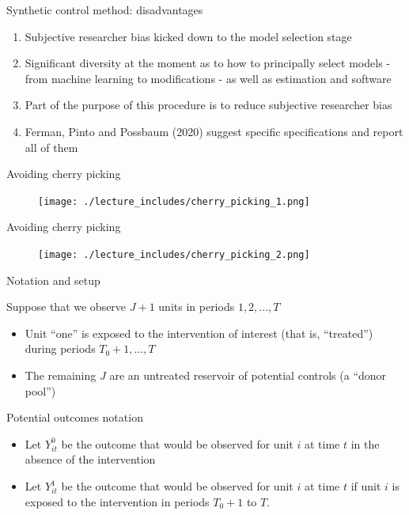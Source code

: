 \documentclass{beamer}
\begin{document}
\begin{frame}{Synthetic control method: disadvantages}

\begin{enumerate}
\item Subjective researcher bias kicked down to the model selection stage
\item Significant diversity at the moment as to how to principally select models - from machine learning to modifications - as well as estimation and software
\item Part of the purpose of this procedure is to reduce subjective researcher bias
\item Ferman, Pinto and Possbaum (2020) suggest specific specifications and report all of them
\end{enumerate}

\end{frame}


\begin{frame}{Avoiding cherry picking}

	\begin{figure}
	\texttt{[image: ./lecture\_includes/cherry\_picking\_1.png]}
	\end{figure}

\end{frame}

\begin{frame}{Avoiding cherry picking}

	\begin{figure}
	\texttt{[image: ./lecture\_includes/cherry\_picking\_2.png]}
	\end{figure}

\end{frame}


\begin{frame}{Notation and setup}
	
Suppose that we observe $J+1$ units in periods $1, 2, \dots, T$
		\begin{itemize}
		\item Unit ``one'' is exposed to the intervention of interest (that is, ``treated'') during periods $T_0+1, \dots, T$
		\item The remaining $J$ are an untreated reservoir of potential controls (a ``donor pool'')
		\end{itemize}	
\end{frame}


\begin{frame}{Potential outcomes notation}

		\begin{itemize}
		\item Let $Y_{it}^0$ be the outcome that would be observed for unit $i$ at time $t$ in the absence of the intervention
		\item Let $Y_{it}^1$ be the outcome that would be observed for unit $i$ at time $t$ if unit $i$ is exposed to the intervention in periods $T_0+1$ to $T$.
		\end{itemize}

\end{frame}
\end{document}
